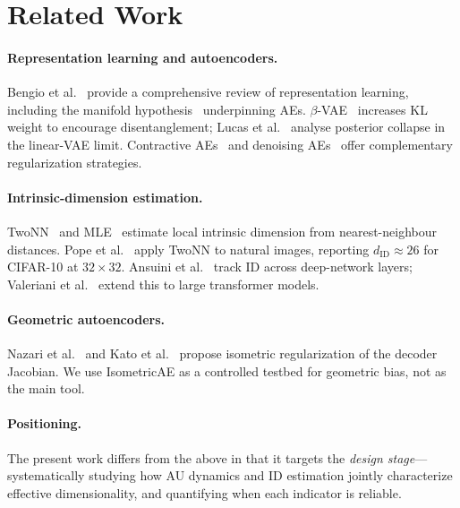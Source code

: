 \documentclass[make,article,submit,pdftex,moreauthors]{Definitions/mdpi}
\begin{document}
\section{Related Work}\label{sec:related}

\paragraph{Representation learning and autoencoders.}
Bengio et al.~\cite{bengio2013representation} provide a comprehensive review of
representation learning, including the manifold hypothesis~\cite{fefferman2016manifold}
underpinning AEs.  $\beta$-VAE~\cite{higgins2017betavae} increases KL weight to
encourage disentanglement; Lucas et al.~\cite{lucas2019elbo} analyse posterior
collapse in the linear-VAE limit.  Contractive AEs~\cite{rifai2011cae} and
denoising AEs~\cite{alain2014dae} offer complementary regularization strategies.

\paragraph{Intrinsic-dimension estimation.}
TwoNN~\cite{facco2017twonn} and MLE~\cite{levina2005mle} estimate local
intrinsic dimension from nearest-neighbour distances.  Pope et
al.~\cite{pope2021intrinsic} apply TwoNN to natural images, reporting
$d_{\mathrm{ID}}\approx26$ for CIFAR-10 at $32\!\times\!32$.  Ansuini et
al.~\cite{ansuini2019intrinsic} track ID across deep-network layers; Valeriani
et al.~\cite{valeriani2023geometry} extend this to large transformer models.

\paragraph{Geometric autoencoders.}
Nazari et al.~\cite{nazari2023geometric} and Kato et
al.~\cite{kato2020rdae} propose isometric regularization of the decoder Jacobian.
We use IsometricAE as a controlled testbed for geometric bias, not as the main tool.

\paragraph{Positioning.}
The present work differs from the above in that it targets the \emph{design
stage}—systematically studying how AU dynamics and ID estimation jointly
characterize effective dimensionality, and quantifying when each indicator is
reliable.
\end{document}
